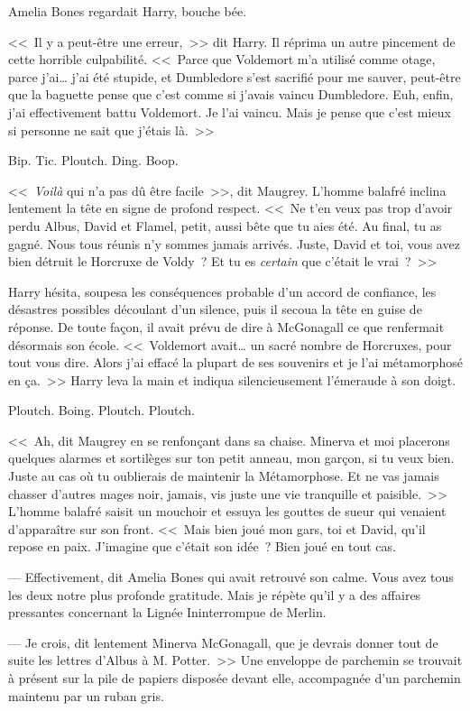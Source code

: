 Amelia Bones regardait Harry, bouche bée.

<<~Il y a peut-être une erreur,~>> dit Harry. Il réprima un autre pincement de cette horrible culpabilité. <<~Parce que Voldemort m'a utilisé comme otage, parce j'ai… j'ai été stupide, et Dumbledore s'est sacrifié pour me sauver, peut-être que la baguette pense que c'est comme si j'avais vaincu Dumbledore. Euh, enfin, j'ai effectivement battu Voldemort. Je l'ai vaincu. Mais je pense que c'est mieux si personne ne sait que j'étais là.~>>

Bip. Tic. Ploutch. Ding. Boop.

<<~\emph{Voilà} qui n'a pas dû être facile~>>, dit Maugrey. L'homme balafré inclina lentement la tête en signe de profond respect. <<~Ne t'en veux pas trop d'avoir perdu Albus, David et Flamel, petit, aussi bête que tu aies été. Au final, tu as gagné. Nous tous réunis n'y sommes jamais arrivés. Juste, David et toi, vous avez bien détruit le Horcruxe de Voldy~? Et tu es \emph{certain} que c'était le vrai~?~>>

Harry hésita, soupesa les conséquences probable d'un accord de confiance, les désastres possibles découlant d'un silence, puis il secoua la tête en guise de réponse. De toute façon, il avait prévu de dire à McGonagall ce que renfermait désormais son école. <<~Voldemort avait… un sacré nombre de Horcruxes, pour tout vous dire. Alors j'ai effacé la plupart de ses souvenirs et je l'ai métamorphosé en ça.~>> Harry leva la main et indiqua silencieusement l'émeraude à son doigt.

Ploutch. Boing. Ploutch. Ploutch.

<<~Ah, dit Maugrey en se renfonçant dans sa chaise. Minerva et moi placerons quelques alarmes et sortilèges sur ton petit anneau, mon garçon, si tu veux bien. Juste au cas où tu oublierais de maintenir la Métamorphose. Et ne vas jamais chasser d'autres mages noir, jamais, vis juste une vie tranquille et paisible.~>> L'homme balafré saisit un mouchoir et essuya les gouttes de sueur qui venaient d'apparaître sur son front. <<~Mais bien joué mon gars, toi et David, qu'il repose en paix. J'imagine que c'était son idée~? Bien joué en tout cas.

--- Effectivement, dit Amelia Bones qui avait retrouvé son calme. Vous avez tous les deux notre plus profonde gratitude. Mais je répète qu'il y a des affaires pressantes concernant la Lignée Ininterrompue de Merlin.

--- Je crois, dit lentement Minerva McGonagall, que je devrais donner tout de suite les lettres d'Albus à M. Potter.~>> Une enveloppe de parchemin se trouvait à présent sur la pile de papiers disposée devant elle, accompagnée d'un parchemin maintenu par un ruban gris.

